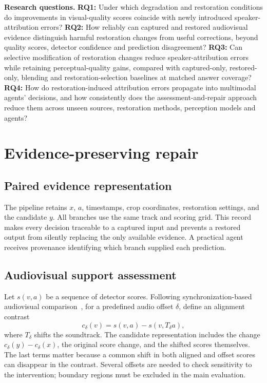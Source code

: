 \noindent\textbf{Research questions.}
\textbf{RQ1:} Under which degradation and restoration conditions do improvements in visual-quality scores coincide with newly introduced speaker-attribution errors?
\textbf{RQ2:} How reliably can captured and restored audiovisual evidence distinguish harmful restoration changes from useful corrections, beyond quality scores, detector confidence and prediction disagreement?
\textbf{RQ3:} Can selective modification of restoration changes reduce speaker-attribution errors while retaining perceptual-quality gains, compared with captured-only, restored-only, blending and restoration-selection baselines at matched answer coverage?
\textbf{RQ4:} How do restoration-induced attribution errors propagate into multimodal agents' decisions, and how consistently does the assessment-and-repair approach reduce them across unseen sources, restoration methods, perception models and agents?

\section{Evidence-preserving repair}
\label{sec:method}
\noindent{}

\subsection{Paired evidence representation}
The pipeline retains $x$, $a$, timestamps, crop coordinates, restoration settings, and the candidate $y$. All branches use the same track and scoring grid. This record makes every decision traceable to a captured input and prevents a restored output from silently replacing the only available evidence. A practical agent receives provenance identifying which branch supplied each prediction.

\subsection{Audiovisual support assessment}
Let $s(v,a)$ be a sequence of detector scores. Following synchronization-based audiovisual comparison~\cite{syncnet}, for a predefined audio offset $\delta$, define an alignment contrast
\begin{equation}
c_\delta(v)=s(v,a)-s(v,T_\delta a),
\end{equation}
where $T_\delta$ shifts the soundtrack. The candidate representation includes the change $c_\delta(y)-c_\delta(x)$, the original score change, and the shifted scores themselves. The last terms matter because a common shift in both aligned and offset scores can disappear in the contrast. Several offsets are needed to check sensitivity to the intervention; boundary regions must be excluded in the main evaluation.

